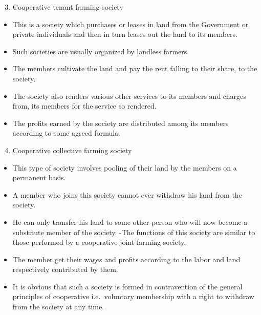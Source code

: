\documentclass[12pt,ignorenonframetext,aspectratio=169]{beamer}
\providecommand{\tightlist}{%
  \setlength{\itemsep}{0pt}\setlength{\parskip}{0pt}}
\begin{document}
\begin{frame}{}
\protect\hypertarget{section-2}{}
\begin{enumerate}
\setcounter{enumi}{2}
\tightlist
\item
  Cooperative tenant farming society
\end{enumerate}

\begin{itemize}
\tightlist
\item
  This is a society which purchases or leases in land from the
  Government or private individuals and then in turn leases out the land
  to its members.
\item
  Such societies are usually organized by landless farmers.
\item
  The members cultivate the land and pay the rent falling to their
  share, to the society.
\item
  The society also renders various other services to its members and
  charges from, its members for the service so rendered.
\item
  The profits earned by the society are distributed among its members
  according to some agreed formula.
\end{itemize}
\end{frame}

\begin{frame}{}
\protect\hypertarget{section-3}{}
\begin{enumerate}
\setcounter{enumi}{3}
\tightlist
\item
  Cooperative collective farming society
\end{enumerate}

\begin{itemize}
\tightlist
\item
  This type of society involves pooling of their land by the members on
  a permanent basis.
\item
  A member who joins this society cannot ever withdraw his land from the
  society.
\item
  He can only transfer his land to some other person who will now become
  a substitute member of the society. -The functions of this society are
  similar to those performed by a cooperative joint farming society.
\item
  The member get their wages and profits according to the labor and land
  respectively contributed by them.
\item
  It is obvious that such a society is formed in contravention of the
  general principles of cooperative i.e.~voluntary membership with a
  right to withdraw from the society at any time.
\end{itemize}
\end{frame}
\end{document}
